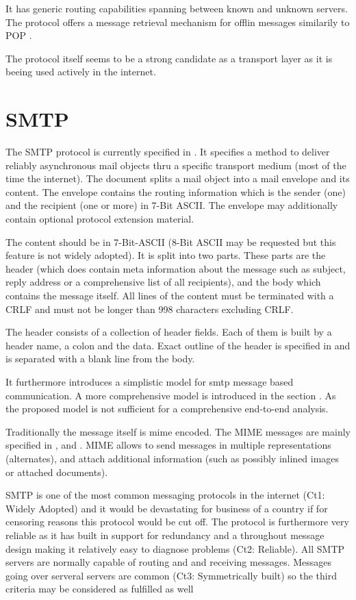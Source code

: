 \documentclass[a4paper,appendixprefix,pdfusetitle,twocolumn,draft,8pt]{scrbook}
\begin{document}
It has generic routing capabilities spanning between known and unknown servers. The protocol offers a message retrieval mechanism for offlin messages similarily to POP \cite{xep0013}.

The protocol itself seems to be a strong candidate as a transport layer as it is beeing used actively in the internet.

\section{SMTP}
The SMTP protocol is currently specified in \cite{RFC5321}. It specifies a method to deliver reliably asynchronous mail objects thru a specific transport medium (most of the time the internet). The document splits a mail object into a mail envelope and its content. The envelope contains the routing information which is the sender (one) and the recipient (one or more) in 7-Bit ASCII. The envelope may additionally contain optional protocol extension material. \par

The content should be in 7-Bit-ASCII (8-Bit ASCII may be requested but this feature is not widely adopted). It is split into two parts. These parts are the header (which does contain meta information about the message such as subject, reply address or a comprehensive list of all recipients), and the body which contains the message itself. All lines of the content must be terminated with a CRLF and must not be longer than 998 characters excluding CRLF.\par

The header consists of a collection of header fields. Each of them is built by a header name, a colon and the data. Exact outline of the header is specified in \cite{RFC5322} and is separated with a blank line from the body. 

It \cite{RFC5321} furthermore introduces a simplistic model for smtp message based communication. A more comprehensive model is introduced in the section . As the proposed model is not sufficient for a comprehensive end-to-end analysis.\par

Traditionally the message itself is mime encoded. The MIME messages are mainly specified in \cite{RFC2045}, and \cite{RFC2046}. MIME allows to send messages in multiple representations (alternates), and attach additional information (such as possibly inlined images or attached documents). 

SMTP is one of the most common messaging protocols in the internet (Ct1: Widely Adopted) and it would be devastating for business of a country if for censoring reasons this protocol would be cut off. The protocol is furthermore very reliable as it has built in support for redundancy and a throughout message design making it relatively easy to diagnose problems (Ct2: Reliable). All SMTP servers are normally capable of routing and and receiving messages. Messages going over serveral servers are common (Ct3: Symmetrically built) so the third criteria may be considered as fulfilled as well
\end{document}
